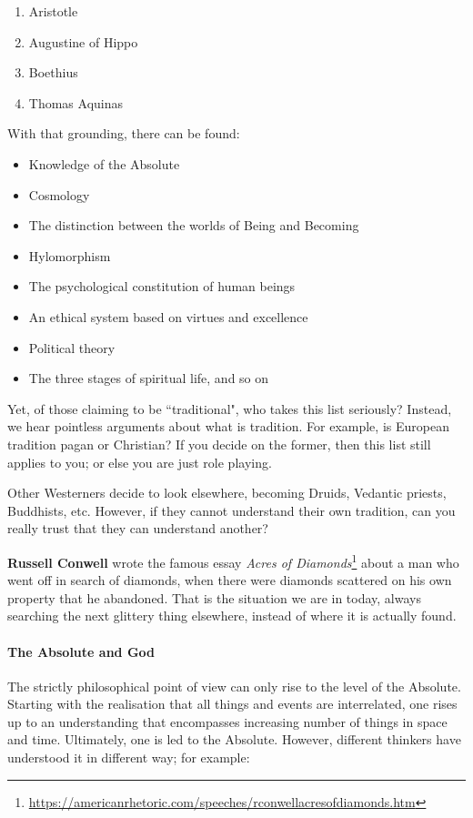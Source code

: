 \begin{enumerate}
\item Aristotle 
\item Augustine of Hippo 
\item Boethius 
\item Thomas Aquinas 
\end{enumerate}
With that grounding, there can be found:

\begin{itemize}
\item Knowledge of the Absolute 
\item Cosmology 
\item The distinction between the worlds of Being and Becoming 
\item Hylomorphism 
\item The psychological constitution of human beings 
\item An ethical system based on virtues and excellence 
\item Political theory 
\item The three stages of spiritual life, and so on 
\end{itemize}
Yet, of those claiming to be ``traditional", who takes this list seriously? Instead, we hear pointless arguments about what is tradition. For example, is European tradition pagan or Christian? If you decide on the former, then this list still applies to you; or else you are just role playing.

Other Westerners decide to look elsewhere, becoming Druids, Vedantic priests, Buddhists, etc. However, if they cannot understand their own tradition, can you really trust that they can understand another?

\textbf{Russell Conwell} wrote the famous essay \textit{Acres of Diamonds}\footnote{\url{https://americanrhetoric.com/speeches/rconwellacresofdiamonds.htm}} about a man who went off in search of diamonds, when there were diamonds scattered on his own property that he abandoned. That is the situation we are in today, always searching the next glittery thing elsewhere, instead of where it is actually found.

\paragraph{The Absolute and God}
The strictly philosophical point of view can only rise to the level of the Absolute. Starting with the realisation that all things and events are interrelated, one rises up to an understanding that encompasses increasing number of things in space and time. Ultimately, one is led to the Absolute. However, different thinkers have understood it in different way; for example:

